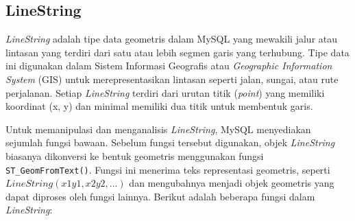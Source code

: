 \subsection{LineString ~\cite{oracle:24:mysql8.4}}
\label{subs:linestring}
\textit{LineString} adalah tipe data geometris dalam MySQL yang mewakili jalur atau lintasan yang terdiri dari satu atau lebih segmen garis yang terhubung. Tipe data ini digunakan dalam Sistem Informasi Geografis atau \textit{Geographic Information System} (GIS) untuk merepresentasikan lintasan seperti jalan, sungai, atau rute perjalanan. Setiap \textit{LineString} terdiri dari urutan titik (\textit{point}) yang memiliki koordinat (x, y) dan minimal memiliki dua titik untuk membentuk garis.

Untuk memanipulasi dan menganalisis \textit{LineString}, MySQL menyediakan sejumlah fungsi bawaan. Sebelum fungsi tersebut digunakan, objek \textit{LineString} biasanya dikonversi ke bentuk geometris menggunakan fungsi \texttt{ST\_GeomFromText()}. Fungsi ini menerima teks representasi geometris, seperti $LineString(x1 y1, x2 y2, ...)$ dan mengubahnya menjadi objek geometris yang dapat diproses oleh fungsi lainnya. Berikut adalah beberapa fungsi dalam \textit{LineString}:
